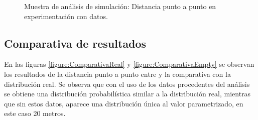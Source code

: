 \begin{figure}[!htb]
\begin{minipage}{0.48\textwidth}
\caption{Muestra de análisis de simulación: Distancia punto a punto en experimentación 
con datos.}
\label{figure:SimulatedPointToPoint}
\end{minipage}
\end{figure}
\newpage

\subsection{Comparativa de resultados}
En las figuras \ref{figure:ComparativaReal} y \ref{figure:ComparativaEmpty} se 
observan los resultados de la distancia punto a punto entre y la comparativa con la 
distribución real. Se observa que con el uso de los datos 
procedentes del análisis se obtiene una distribución probabilística similar a la 
distribución real, mientras que sin estos datos, aparece una distribución única al valor 
parametrizado, en este caso 20 metros.


